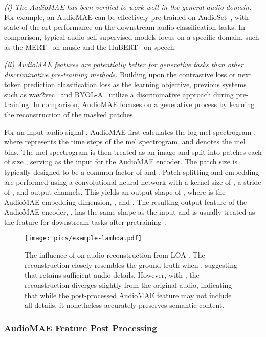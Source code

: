 \documentclass[lettersize,journal]{IEEEtran}
\begin{document}
\textit{(i) The AudioMAE has been verified to work well in the general audio domain.} For example, an AudioMAE can be effectively pre-trained on AudioSet~\cite{gemmeke2017audio}, with state-of-the-art performance on the downstream audio classification tasks. In comparison, typical audio self-supervised models focus on a specific domain, such as the MERT~\cite{li2023mert} on music and the HuBERT~\cite{hsu2021hubert} on speech. 


\textit{(ii) AudioMAE features are potentially better for generative tasks than other discriminative pre-training methods.} Building upon the contrastive loss or next token prediction classification loss as the learning objective, previous systems such as wav2vec~\cite{schneider2019wav2vec} and BYOL-A~\cite{niizumi2021byol} utilize a discriminative approach during pre-training. In comparison, AudioMAE focuses on a generative process by learning the reconstruction of the masked patches. 


For an input audio signal , AudioMAE first calculates the log mel spectrogram , where  represents the time steps of the mel spectrogram, and  denotes the mel bins. The mel spectrogram  is then treated as an image and split into patches each of size , serving as the input for the AudioMAE encoder. The patch size  is typically designed to be a common factor of  and . Patch splitting and embedding are performed using a convolutional neural network with a kernel size of , a stride of , and  output channels. This yields an output shape of , where  is the AudioMAE embedding dimension, , and . The resulting output feature of the AudioMAE encoder, , has the same shape as the input and is usually treated as the feature for downstream tasks after pretraining~\cite{xu2022masked}. 

\begin{figure}[t]
    \centering
    \texttt{[image: pics/example-lambda.pdf]}
    \caption{The influence of  on audio reconstruction from LOA . The reconstruction closely resembles the ground truth when , suggesting that  retains sufficient audio details. However, with , the reconstruction diverges slightly from the original audio, indicating that while the post-processed AudioMAE feature may not include all details, it nonetheless accurately preserves semantic content.}
    \label{fig: effect-of-lambda_compressed}
\end{figure}

\subsubsection{AudioMAE Feature Post Processing}
\end{document}
